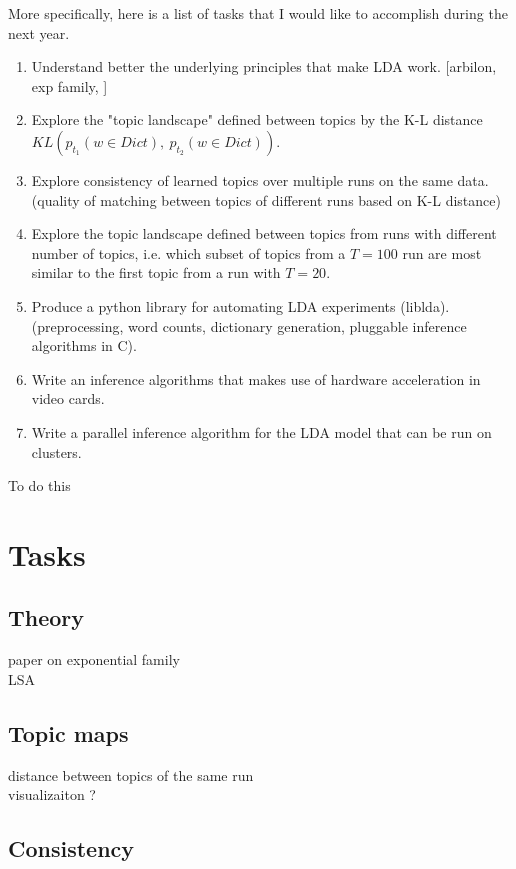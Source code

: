 \documentclass[letterpaper,12pt]{article}
\begin{document}
	More specifically, here is a list of tasks that I would like to accomplish
	during the next year.
	\begin{enumerate}
		\item	Understand better the underlying principles 
				that make LDA work. [arbilon, exp family, ]
		\item	Explore the "topic landscape" defined between
				topics by the K-L distance ${KL}(p_{t_1}(w\in Dict),\ p_{t_2}(w \in Dict))$.
		\item	Explore consistency of learned topics over multiple runs on the same
				data. (quality of matching between topics of different runs based on K-L distance)
		\item	Explore the topic landscape defined between topics from runs with different
				number of topics, i.e. which subset of topics from a $T=100$ run are most 
				similar to the first topic from a run with $T=20$. 
		\item	Produce a python library for automating LDA
				experiments (liblda).
				(preprocessing, word counts, dictionary generation, 
				pluggable inference algorithms in C).
		\item	Write an inference algorithms that makes use of hardware acceleration
				in video cards.
		\item	Write a parallel inference algorithm for the LDA model that
				can be run on clusters.
	\end{enumerate}
	
	To do this 
	
	
\section{Tasks}

	\subsection{Theory}
	
		paper on exponential family  \\
		LSA 
		
	\subsection{Topic maps}
	
		distance between topics of the same run \\
		visualizaiton ?
	
	\subsection{Consistency}
		
\end{document}
